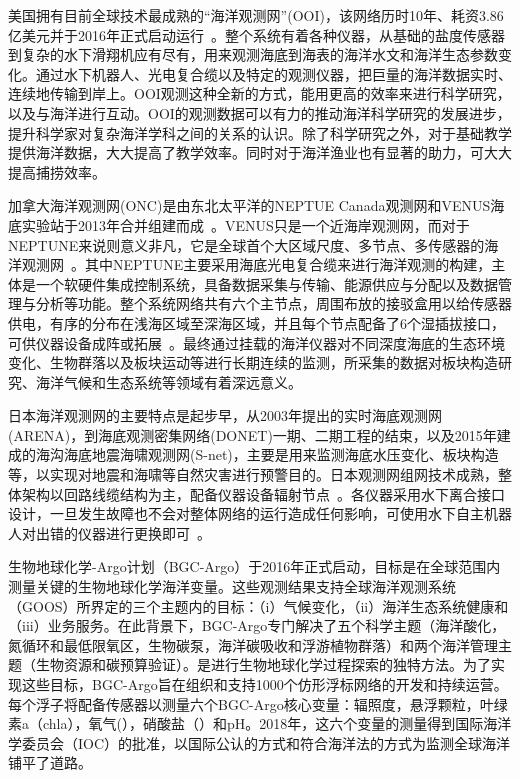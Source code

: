美国拥有目前全球技术最成熟的“海洋观测网”(OOI)，该网络历时10年、耗资3.86亿美元并于2016年正式启动运行~\cite{2016wzj}。整个系统有着各种仪器，从基础的盐度传感器到复杂的水下滑翔机应有尽有，用来观测海底到海表的海洋水文和海洋生态参数变化。通过水下机器人、光电复合缆以及特定的观测仪器，把巨量的海洋数据实时、连续地传输到岸上。OOI观测这种全新的方式，能用更高的效率来进行科学研究，以及与海洋进行互动。OOI的观测数据可以有力的推动海洋科学研究的发展进步，提升科学家对复杂海洋学科之间的关系的认识。除了科学研究之外，对于基础教学提供海洋数据，大大提高了教学效率。同时对于海洋渔业也有显著的助力，可大大提高捕捞效率。

加拿大海洋观测网(ONC)是由东北太平洋的NEPTUE Canada观测网和VENUS海底实验站于2013年合并组建而成~\cite{2013hpy}。VENUS只是一个近海岸观测网，而对于NEPTUNE来说则意义非凡，它是全球首个大区域尺度、多节点、多传感器的海洋观测网~\cite{2017zjj}。其中NEPTUNE主要采用海底光电复合缆来进行海洋观测的构建，主体是一个软硬件集成控制系统，具备数据采集与传输、能源供应与分配以及数据管理与分析等功能。整个系统网络共有六个主节点，周围布放的接驳盒用以给传感器供电，有序的分布在浅海区域至深海区域，并且每个节点配备了6个湿插拔接口，可供仪器设备成阵或拓展~\cite{2020cjd}。最终通过挂载的海洋仪器对不同深度海底的生态环境变化、生物群落以及板块运动等进行长期连续的监测，所采集的数据对板块构造研究、海洋气候和生态系统等领域有着深远意义。

日本海洋观测网的主要特点是起步早，从2003年提出的实时海底观测网(ARENA)，到海底观测密集网络(DONET)一期、二期工程的结束，以及2015年建成的海沟海底地震海啸观测网(S-net)，主要是用来监测海底水压变化、板块构造等，以实现对地震和海啸等自然灾害进行预警目的。日本观测网组网技术成熟，整体架构以回路线缆结构为主，配备仪器设备辐射节点~\cite{2020cjd}。各仪器采用水下离合接口设计，一旦发生故障也不会对整体网络的运行造成任何影响，可使用水下自主机器人对出错的仪器进行更换即可~\cite{2013hpy}。

生物地球化学-Argo计划（BGC-Argo）于2016年正式启动，目标是在全球范围内测量关键的生物地球化学海洋变量。这些观测结果支持全球海洋观测系统（GOOS）所界定的三个主题内的目标：（i）气候变化，（ii）海洋生态系统健康和（iii）业务服务。在此背景下，BGC-Argo专门解决了五个科学主题（海洋酸化，氮循环和最低限氧区，生物碳泵，海洋碳吸收和浮游植物群落）和两个海洋管理主题（生物资源和碳预算验证）。是进行生物地球化学过程探索的独特方法。为了实现这些目标，BGC-Argo旨在组织和支持1000个仿形浮标网络的开发和持续运营。每个浮子将配备传感器以测量六个BGC-Argo核心变量：辐照度，悬浮颗粒，叶绿素a（chla），氧气(），硝酸盐（）和pH。2018年，这六个变量的测量得到国际海洋学委员会（IOC）的批准，以国际公认的方式和符合海洋法的方式为监测全球海洋铺平了道路。

